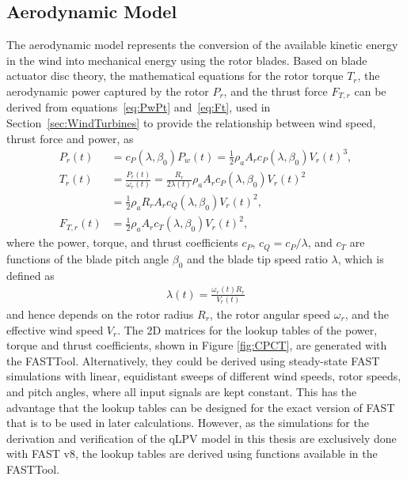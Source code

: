 \subsection{Aerodynamic Model}
The aerodynamic model represents the conversion of the available kinetic energy in the wind into mechanical energy using the rotor blades. Based on blade actuator disc theory, the mathematical equations for the rotor torque $T_{r}$, the aerodynamic power captured by the rotor $P_{r}$, and the thrust force $F_{T,r}$ can be derived from equations~\eqref{eq:PwPt} and~\eqref{eq:Ft}, used in Section~\ref{sec:WindTurbines} to provide the relationship between wind speed, thrust force and power, as
\begin{equation}\label{eq:aero}
    \begin{split}
        P_{r}(t) & = c_P(\lambda,\beta_0) P_{w}(t) = \frac{1}{2} \rho_a A_r c_P(\lambda,\beta_0) V_r(t)^3, \\
        T_{r}(t) & = \frac{P_{r}(t)}{\omega_{r}(t)} %
        = \frac{R_r}{2\lambda(t)} \rho_a A_r  c_P(\lambda,\beta_0) V_r(t)^{2} \\
        & =  \frac{1}{2} \rho_a R_r A_r  c_Q(\lambda,\beta_0) V_r(t)^{2} ,\\
        F_{T,r}(t) & = \frac{1}{2} \rho_a A_r  c_{T}(\lambda,\beta_0) V_r(t)^{2},
    \end{split}
\end{equation}
where the power, torque, and thrust coefficients $c_P$, $c_Q = c_P/\lambda$, and $c_{T}$ are functions of the blade pitch angle $\beta_0$ and the blade tip speed ratio $\lambda$, which is defined as
\begin{align*}
    \lambda(t) = \frac{\omega_{r}(t) R_r}{V_r(t)}
\end{align*}
and hence depends on the rotor radius $R_r$, the rotor angular speed $\omega_{r}$, and the effective wind speed $V_r$. The 2D matrices for the lookup tables of the power, torque and thrust coefficients, shown in Figure \ref{fig:CPCT}, are generated with the FASTTool.  Alternatively, they could be derived using steady-state FAST simulations with linear, equidistant sweeps of different wind speeds, rotor speeds, and pitch angles, where all input signals are kept constant. This has the advantage that the lookup tables can be designed for the exact version of FAST that is to be used in later calculations. However, as the simulations for the derivation and verification of the qLPV model in this thesis are exclusively done with FAST v8, the lookup tables are derived using functions available in the FASTTool.
